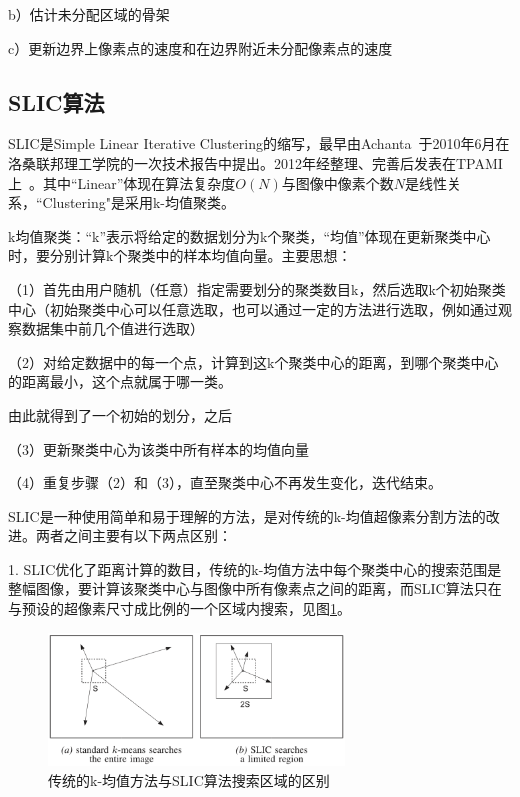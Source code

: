 \documentclass[12pt]{article}
\begin{document}
b）估计未分配区域的骨架

c）更新边界上像素点的速度和在边界附近未分配像素点的速度

\subsection{SLIC算法}

SLIC是Simple Linear Iterative Clustering的缩写，最早由Achanta~\cite{achanta2010slic}于2010年6月在洛桑联邦理工学院的一次技术报告中提出。2012年经整理、完善后发表在TPAMI上~\cite{achanta2012slic}。其中“Linear”体现在算法复杂度$O(N)$与图像中像素个数$N$是线性关系，“Clustering"是采用k-均值聚类。

k均值聚类：“k”表示将给定的数据划分为k个聚类，“均值”体现在更新聚类中心时，要分别计算k个聚类中的样本均值向量。主要思想：

（1）首先由用户随机（任意）指定需要划分的聚类数目k，然后选取k个初始聚类中心（初始聚类中心可以任意选取，也可以通过一定的方法进行选取，例如通过观察数据集中前几个值进行选取）

（2）对给定数据中的每一个点，计算到这k个聚类中心的距离，到哪个聚类中心的距离最小，这个点就属于哪一类。

由此就得到了一个初始的划分，之后

（3）更新聚类中心为该类中所有样本的均值向量

（4）重复步骤（2）和（3），直至聚类中心不再发生变化，迭代结束。

SLIC是一种使用简单和易于理解的方法，是对传统的k-均值超像素分割方法的改进。两者之间主要有以下两点区别：

1. SLIC优化了距离计算的数目，传统的k-均值方法中每个聚类中心的搜索范围是整幅图像，要计算该聚类中心与图像中所有像素点之间的距离，而SLIC算法只在与预设的超像素尺寸成比例的一个区域内搜索，见图\ref{fig: searchregion}。

\begin{figure}[!ht]
\centering
\includegraphics[width=0.7\textwidth]{searchregion.png}
\caption{传统的k-均值方法与SLIC算法搜索区域的区别}
\label{fig: searchregion}
\end{figure} 
\end{document}
